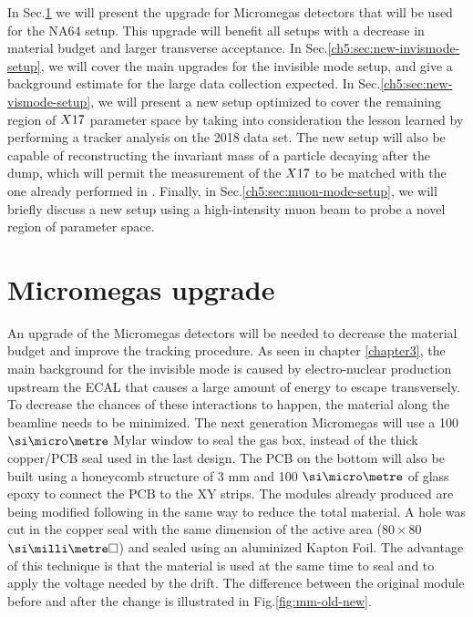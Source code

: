In Sec.\ref{ch5:sec:mm-upgrades} we will present the upgrade for Micromegas detectors that will be used for the NA64 setup. This upgrade will benefit all setups with a decrease in material budget and larger transverse acceptance. In Sec.\ref{ch5:sec:new-invismode-setup}, we will cover the main upgrades for the invisible mode setup, and give a background estimate for the large data collection expected. In Sec.\ref{ch5:sec:new-vismode-setup}, we will present a new setup optimized to cover the remaining region of $X17$ parameter space by taking into consideration the lesson learned by performing a tracker analysis on the 2018 data set. The new setup will also be capable of reconstructing the invariant mass of a particle decaying after the dump, which will permit the measurement of the $X17$ to be matched with the one already performed in \cite{Krasznahorkay:2015iga,Krasznahorkay:2019lyl}. Finally, in Sec.\ref{ch5:sec:muon-mode-setup}, we will briefly discuss a new setup using a high-intensity muon beam to probe a novel region of parameter space.

\section{Micromegas upgrade}
\label{ch5:sec:mm-upgrades}

An upgrade of the Micromegas detectors will be needed to decrease the material budget and improve the tracking procedure. As seen in chapter \ref{chapter3}, the main background for the invisible mode is caused by electro-nuclear production upstream the ECAL that causes a large amount of energy to escape transversely. To decrease the chances of these interactions to happen, the material along the beamline needs to be minimized. The next generation Micromegas will use a 100 $\mum$ Mylar window to seal the gas box, instead of the thick copper/PCB seal used in the last design. The PCB on the bottom will also be built using a honeycomb structure of 3 mm and 100 $\mum$ of glass epoxy to connect the PCB to the XY strips. The modules already produced are being modified following in the same way to reduce the total material. A hole was cut in the copper seal with the same dimension of the active area ($80 \times 80$ $\mms$) and sealed using an aluminized Kapton Foil. The advantage of this technique is that the material is used at the same time to seal and to apply the voltage needed by the drift. The difference between the original module before and after the change is illustrated in Fig.\ref{fig:mm-old-new}.

